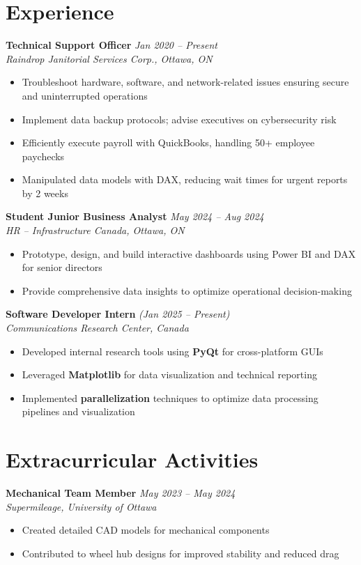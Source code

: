 \documentclass[11pt]{article}
\begin{document}
\section*{Experience}

\textbf{Technical Support Officer} \hfill \textit{Jan 2020 -- Present} \\
\textit{Raindrop Janitorial Services Corp., Ottawa, ON}
\begin{itemize}
    \item Troubleshoot hardware, software, and network-related issues ensuring secure and uninterrupted operations
    \item Implement data backup protocols; advise executives on cybersecurity risk
    \item Efficiently execute payroll with QuickBooks, handling 50+ employee paychecks
    \item Manipulated data models with DAX, reducing wait times for urgent reports by 2 weeks
\end{itemize}

\textbf{Student Junior Business Analyst} \hfill \textit{May 2024 -- Aug 2024} \\
\textit{HR -- Infrastructure Canada, Ottawa, ON}
\begin{itemize}
    \item Prototype, design, and build interactive dashboards using Power BI and DAX for senior directors
    \item Provide comprehensive data insights to optimize operational decision-making
\end{itemize}

\textbf{Software Developer Intern} \hfill \textit{(Jan 2025 -- Present)} \\
\textit{Communications Research Center, Canada}
\begin{itemize}
    \item Developed internal research tools using \textbf{PyQt} for cross-platform GUIs
    \item Leveraged \textbf{Matplotlib} for data visualization and technical reporting
    \item Implemented \textbf{parallelization} techniques to optimize data processing pipelines and visualization
\end{itemize}

\section*{Extracurricular Activities}
\textbf{Mechanical Team Member} \hfill \textit{May 2023 -- May 2024} \\
\textit{Supermileage, University of Ottawa}
\begin{itemize}
    \item Created detailed CAD models for mechanical components
    \item Contributed to wheel hub designs for improved stability and reduced drag
\end{itemize}
\end{document}
